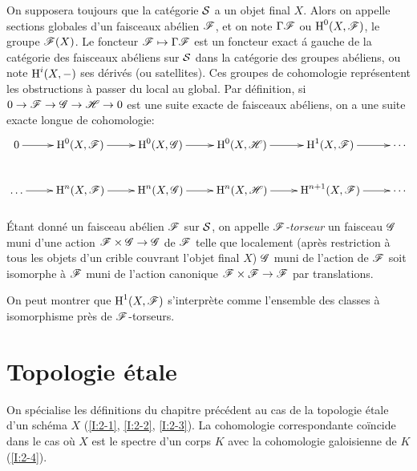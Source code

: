 \documentclass[oneside]{book}
\begin{document}
On supposera toujours que la catégorie $\mathcal{S}$ a un objet final $X$. Alors on 
appelle sections globales d'un faisceaux abélien $\mathscr{F}$, et on note 
$\Gamma\mathscr{F}$ ou $\operatorname{H}^0(X,\mathscr{F})$, le groupe $\mathscr{F}(X)$. Le foncteur 
$\mathscr{F}\mapsto\Gamma\mathscr{F}$ est un foncteur exact \'a gauche de la catégorie des 
faisceaux abéliens sur $\mathcal{S}$ dans la catégorie des groupes abéliens, ou 
note $\operatorname{H}^i(X,-)$ ses dérivés (ou satellites). Ces groupes de cohomologie 
représentent les obstructions à passer du local au global. Par définition, si 
$0\to\mathscr{F}\to\mathscr{G}\to\mathscr{H}\to 0$ est une suite exacte de faisceaux abéliens, on a une 
suite exacte longue de cohomologie:
\[\xymatrix{
  0 \ar[r] 
    & \h^0(X,\cF) \ar[r] 
    & \h^0(X,\cG) \ar[r] 
    & \h^0(X,\cH) \ar[r] 
    & \h^1(X,\cF) \ar[r] 
    & \cdots \\
  \ldots \ar[r] 
    & \h^n(X,\cF) \ar[r] 
    & \h^n(X,\cG) \ar[r]
    & \h^n(X,\cH) \ar[r] 
    & \h^{n+1}(X,\cF) \ar[r] 
    & \cdots
}\]





\subsubsection{}\label{I:1-6-6}

Étant donné un faisceau abélien $\mathscr{F}$ sur $\mathcal{S}$, on appelle 
\emph{$\mathscr{F}$-torseur} un faisceau $\mathscr{G}$ muni d'une action $\mathscr{F}\times\mathscr{G}\to\mathscr{G}$ 
de $\mathscr{F}$ telle que localement (après restriction à tous les objets d'un 
crible couvrant l'objet final $X$) $\mathscr{G}$ muni de l'action de $\mathscr{F}$ soit 
isomorphe à $\mathscr{F}$ muni de l'action canonique $\mathscr{F}\times \mathscr{F}\to \mathscr{F}$ par 
translations. 

On peut montrer que $\operatorname{H}^1(X,\mathscr{F})$ s'interprète comme l'ensemble des classes 
à isomorphisme près de $\mathscr{F}$-torseurs. 




















\section{Topologie étale}\label{I:2}

On spécialise les définitions du chapitre précédent au cas de la 
topologie étale d'un schéma $X$ (\ref{I:2-1}, \ref{I:2-2}, \ref{I:2-3}). La 
cohomologie correspondante coïncide dans le cas où $X$ est le spectre d'un 
corps $K$ avec la cohomologie galoisienne de $K$ (\ref{I:2-4}). 
\end{document}
